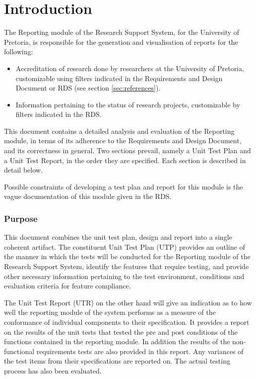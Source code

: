 \section{Introduction}
The Reporting module of the Research Support System, for the University of Pretoria, is responsible for the generation and visualisation of reports for the following:
\begin{itemize}
	\item Accreditation of research done by researchers at the University of Pretoria, customizable using filters indicated in the Requirements and Design Document or RDS (see section \ref{sec:references}).
	\item Information pertaining to the status of research projects, customizable by filters indicated in the RDS.
\end{itemize}

This document contains a detailed analysis and evaluation of the Reporting module, in terms of its adherence to the Requirements and Design Document, and its correctness in general. Two sections prevail, namely a Unit Test Plan and a Unit Test Report, in the order they are specified. Each section is described in detail below. \par Possible constraints of developing a test plan and report for this module is the vague documentation of this module given in the RDS. 

\subsubsection{Purpose}
This document combines the unit test plan, design and report into a single coherent artifact. The constituent Unit Test Plan (UTP) provides an outline of the manner in which the tests will be conducted for the Reporting module of the Research Support System, identify the features that require testing, and provide other necessary information pertaining to the test environment, conditions and evaluation criteria for feature compliance.
\par The Unit Test Report (UTR) on the other hand will give an indication as to how well the reporting module of the system performs as a measure of the conformance of individual components to their specification. It provides a report on the results of the unit tests that tested the pre and post conditions of the functions contained in the reporting module. In addition the results of the non-functional requirements tests are also provided in this report. Any variances of the test items from their specifications are reported on. The actual testing process has also been evaluated. 

